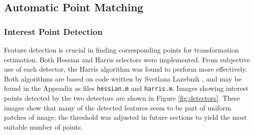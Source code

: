 \documentclass[a4paper, 10pt, conference]{ieeeconf}
\begin{document}
\subsection{Automatic Point Matching }
\subsubsection{Interest Point Detection}

Feature detection is crucial in finding corresponding points for transformation estimation. Both Hessian and Harris selectors were implemented. From subjective use of each detector, the Harris algorithm was found to perform more effectively. Both algorithms are based on code written by Svetlana Lazebnik \cite{harrisdetector}, and may be found in the Appendix as files \texttt{hessian.m} and \texttt{harris.m}. Images showing interest points detected by the two detectors are shown in Figure \ref{fig:detectors}. These images show that many of the detected features seem to be part of uniform patches of image; the threshold was adjusted in future sections to yield the most suitable number of points.
\end{document}
